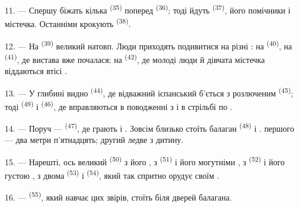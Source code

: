 11. --- Спершу біжать кілька  \textsuperscript{(35)} поперед
 \textsuperscript{(36)}; тоді йдуть 
\textsuperscript{(37)}, його помічники і  містечка.
Останніми крокують  \textsuperscript{(38)}.

\VUsaut{5.0mm}
\VUsaut{3.6mm}

12. --- На  \textsuperscript{(39)} великий натовп. Люди
приходять подивитися на різні : на 
\textsuperscript{(40)}, на  \textsuperscript{(41)}, де вистава вже
почалася; на  \textsuperscript{(42)}, де молоді люди й
дівчата містечка віддаються втісі .

13. --- У глибині видно  \textsuperscript{(44)}, де відважний
іспанський  б'ється з розлюченим 
\textsuperscript{(45)}; тоді  \textsuperscript{(49)} і
 \textsuperscript{(46)}, де вправляються в поводженні з
 і в стрільбі по .

14. --- Поруч ---  \textsuperscript{(47)}, де грають
 і . Зовсім близько стоїть балаган
 \textsuperscript{(48)} і . 
першого --- два метри п'ятнадцять; другий ледве з дитину.

15. --- Нарешті, ось великий  \textsuperscript{(50)} з його
, з  \textsuperscript{(51)} і його
могутніми , з  \textsuperscript{(52)} і його
густою , з двома  \textsuperscript{(53)} і
 \textsuperscript{(54)}, який так спритно орудує своїм
.

16. ---  \textsuperscript{(55)}, який навчає цих звірів,
стоїть біля дверей балагана.
\VUsaut{6.0mm}
\VUfilet{22mm}
